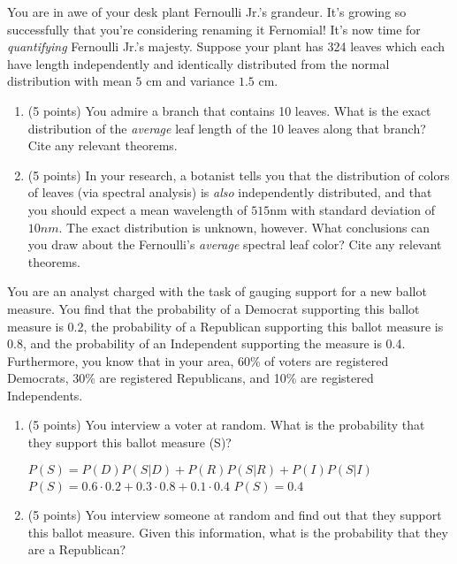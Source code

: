 \documentclass[addpoints]{exam}
\begin{document}
{\begin{questions}
\question[10] You are in awe of your desk plant Fernoulli Jr.'s grandeur.  It's growing so successfully that you're considering renaming it Fernomial!  It's now time for \textit{quantifying} Fernoulli Jr.'s majesty.  Suppose your plant has 324 leaves which each have length independently and identically distributed from the normal distribution with mean $5$ cm and variance $1.5$ cm.
	\begin{enumerate}[label=(\alph*)]
		\item (5 points) You admire a branch that contains 10 leaves.  What is the exact distribution of the \textit{average} leaf length of the 10 leaves along that branch?  Cite any relevant theorems.

		\item (5 points) In your research, a botanist tells you that the distribution of colors of leaves (via spectral analysis) is \textit{also} independently distributed, and that you should expect a mean wavelength of $515$nm with standard deviation of $10nm$.  The exact distribution is unknown, however.  What conclusions can you draw about the Fernoulli's \textit{average} spectral leaf color?  Cite any relevant theorems.
	\end{enumerate}
\clearpage

\question[15] You are an analyst charged with the task of gauging support for a new ballot measure. You find that the probability of a Democrat supporting this ballot measure is 0.2, the probability of a Republican supporting this ballot measure is 0.8, and the probability of an Independent supporting the measure is 0.4. Furthermore, you know that in your area, 60\% of voters are registered Democrats, 30\% are registered Republicans, and 10\% are registered Independents.
	\begin{enumerate}[label=(\alph*)]
		\item (5 points) You interview a voter at random. What is the probability that they support this ballot measure (S)? \newline

		$P(S) = P(D)P(S | D) + P(R)P(S | R) + P(I)P(S | I)$ \newline
		$P(S) = 0.6 \cdot 0.2 + 0.3 \cdot 0.8 + 0.1 \cdot 0.4$ \newline
		$P(S) = 0.4$ \newline

		\item (5 points) You interview someone at random and find out that they support this ballot measure. Given this information, what is the probability that they are a Republican? \newline


\end{enumerate}
\end{questions}}
\end{document}
